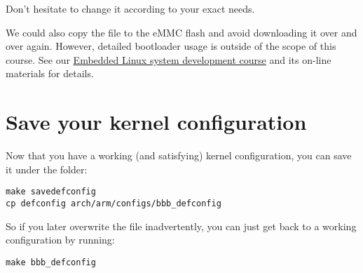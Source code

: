 Don't hesitate to change it according to your exact needs.

We could also copy the  file to the eMMC flash and avoid
downloading it over and over again. However, detailed bootloader
usage is outside of the scope of this course. See our
\href{https://bootlin.com/training/embedded-linux/}{Embedded
Linux system development course} and its on-line materials for
details.

\section{Save your kernel configuration}

Now that you have a working (and satisfying) kernel configuration, you
can save it under the  folder:

\begin{verbatim}
make savedefconfig
cp defconfig arch/arm/configs/bbb_defconfig
\end{verbatim}

So if you later overwrite the  file inadvertently, you can
just get back to a working configuration by running:

\begin{verbatim}
make bbb_defconfig
\end{verbatim}
